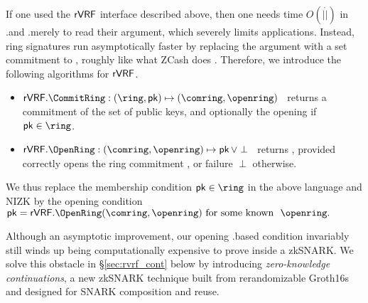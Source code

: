 
If one used the ${\mathsf{rVRF}}$ interface described above, then one needs time
$O(|\ring|)$ in \rVRF.\rSign and \rVRF.\rVerify merely to read their \ring
argument, which severely limits applications.
Instead, ring signatures run asymptotically faster by replacing the \ring
argument with a set commitment to \ring, roughly like what ZCash does \cite{zcash_protocol}. Therefore, we introduce the following algorithms for $ {\mathsf{rVRF}} $.
\begin{itemize} 
	\item $\rVRF.\CommitRing : (\ring,\pk) \mapsto (\comring,\openring)$ \,
	returns a commitment of the set \ring of public keys, and
	optionally the opening \openring if $\pk \in \ring$.
	\item $\rVRF.\OpenRing : (\comring,\openring) \mapsto \pk \, \lor \perp$ \,
	returns \pk, provided \openring correctly opens
	the ring commitment \comring, or failure $\perp$ otherwise.
\end{itemize}

We thus replace the membership condition $\pk \in \ring$ in the above
language and NIZK by the opening condition
$ \pk = \rVRF.\OpenRing(\comring,\openring) \textrm{\ for some known \ } \openring \mathperiod $
%


Although an asymptotic improvement, our opening \rVRF.\OpenRing based condition invariably
still winds up being computationally expensive to prove inside a zkSNARK.
We solve this obstacle in \S\ref{sec:rvrf_cont} below by introducing
{\em zero-knowledge continuations}, a new zkSNARK technique built from
rerandomizable Groth16s \cite{Groth16} and designed for SNARK composition and reuse.

